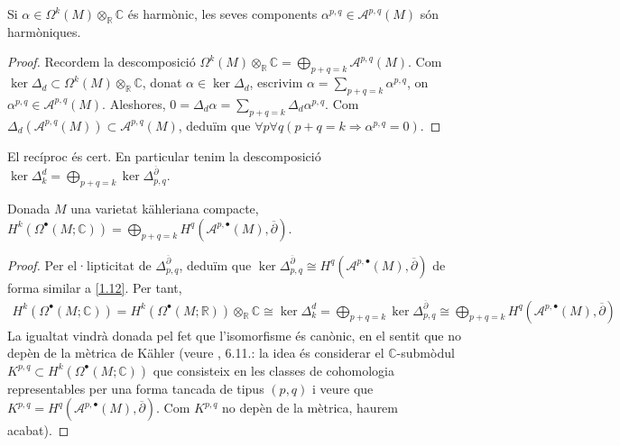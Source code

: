 \begin{corolari}
    Si $\alpha\in\Omega^{k}(M)\otimes_{\mathbb{R}}\mathbb{C}$ és harmònic, les seves components $\alpha^{p,q}\in\mathcal{A}^{p,q}(M)$ són harmòniques.
    \begin{proof}
        Recordem la descomposició $\Omega^{k}(M)\otimes_{\mathbb{R}}\mathbb{C}=\bigoplus_{p+q=k}\mathcal{A}^{p,q}(M)$. Com $\ker{\Delta_{d}}\subset\Omega^{k}(M)\otimes_{\mathbb{R}}\mathbb{C}$, donat $\alpha\in\ker{\Delta_{d}}$, escrivim $\alpha=\sum_{p+q=k}\alpha^{p,q}$, on $\alpha^{p,q}\in\mathcal{A}^{p,q}(M)$. Aleshores, $0=\Delta_{d}\alpha=\sum_{p+q=k}\Delta_{d}\alpha^{p,q}$. Com $\Delta_{d}(\mathcal{A}^{p,q}(M))\subset\mathcal{A}^{p,q}(M)$, deduïm que $\forall p\forall q(p+q=k\Rightarrow\alpha^{p,q}=0)$.
    \end{proof}
\end{corolari}
El recíproc és cert. En particular tenim la descomposició $\ker{\Delta_{k}^{d}}=\bigoplus_{p+q=k}\ker{\Delta_{p,q}^{\overline{\partial}}}$.
\begin{teorema}
    Donada $M$ una varietat kähleriana compacte, $H^{k}(\Omega^{\bullet}(M;\mathbb{C}))=\bigoplus_{p+q=k}H^{q}(\mathcal{A}^{p,\bullet}(M),\overline{\partial})$.
    \begin{proof}
        Per el·lipticitat de $\Delta_{p,q}^{\overline{\partial}}$, deduïm que $\ker{\Delta_{p,q}^{\overline{\partial}}}\cong H^{q}(\mathcal{A}^{p,\bullet}(M),\overline{\partial})$ de forma similar a \ref{1.12}. Per tant,
        \begin{align*}
            H^{k}(\Omega^{\bullet}(M;\mathbb{C}))
            =H^{k}(\Omega^{\bullet}(M;\mathbb{R}))\otimes_{\mathbb{R}}\mathbb{C}
            \cong\ker{\Delta_{k}^{d}}
            =\bigoplus_{p+q=k}\ker{\Delta_{p,q}^{\overline{\partial}}}
            \cong\bigoplus_{p+q=k}H^{q}(\mathcal{A}^{p,\bullet}(M),\overline{\partial})
        \end{align*}
        La igualtat vindrà donada pel fet que l'isomorfisme és canònic, en el sentit que no depèn de la mètrica de Kähler (veure \cite{Voisin_2002}, 6.11.: la idea és considerar el $\mathbb{C}$-submòdul $K^{p,q}\subset H^{k}(\Omega^{\bullet}(M;\mathbb{C}))$ que consisteix en les classes de cohomologia representables per una forma tancada de tipus $(p,q)$ i veure que $K^{p,q}=H^{q}(\mathcal{A}^{p,\bullet}(M),\overline{\partial})$. Com $K^{p,q}$ no depèn de la mètrica, haurem acabat).
    \end{proof}
\end{teorema}
        
